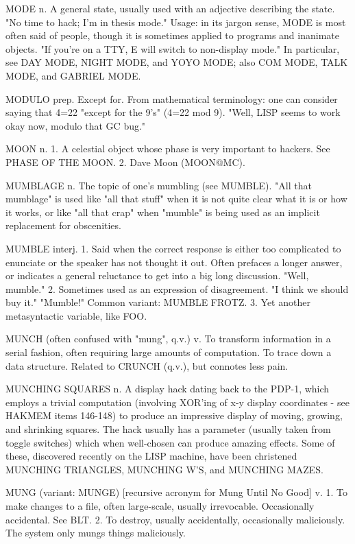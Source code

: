 MODE n. A general state, usually used with an adjective describing the
   state.  "No time to hack; I'm in thesis mode."  Usage: in its
   jargon sense, MODE is most often said of people, though it is
   sometimes applied to programs and inanimate objects.	 "If you're on
   a TTY, E will switch to non-display mode."  In particular, see DAY
   MODE, NIGHT MODE, and YOYO MODE; also COM MODE, TALK MODE, and
   GABRIEL MODE.

MODULO prep. Except for.  From mathematical terminology: one can
   consider saying that 4=22 "except for the 9's" (4=22 mod 9).
   "Well, LISP seems to work okay now, modulo that GC bug."

MOON n. 1. A celestial object whose phase is very important to
   hackers.  See PHASE OF THE MOON.  2. Dave Moon (MOON@MC).

MUMBLAGE n. The topic of one's mumbling (see MUMBLE).  "All that
   mumblage" is used like "all that stuff" when it is not quite clear
   what it is or how it works, or like "all that crap" when "mumble"
   is being used as an implicit replacement for obscenities.

MUMBLE interj. 1. Said when the correct response is either too
   complicated to enunciate or the speaker has not thought it out.
   Often prefaces a longer answer, or indicates a general reluctance
   to get into a big long discussion.  "Well, mumble."	2. Sometimes
   used as an expression of disagreement.  "I think we should buy it."
   "Mumble!"  Common variant: MUMBLE FROTZ.  3. Yet another
   metasyntactic variable, like FOO.

MUNCH (often confused with "mung", q.v.) v. To transform information
   in a serial fashion, often requiring large amounts of computation.
   To trace down a data structure.  Related to CRUNCH (q.v.), but
   connotes less pain.

MUNCHING SQUARES n. A display hack dating back to the PDP-1, which
   employs a trivial computation (involving XOR'ing of x-y display
   coordinates - see HAKMEM items 146-148) to produce an impressive
   display of moving, growing, and shrinking squares.  The hack
   usually has a parameter (usually taken from toggle switches) which
   when well-chosen can produce amazing effects.  Some of these,
   discovered recently on the LISP machine, have been christened
   MUNCHING TRIANGLES, MUNCHING W'S, and MUNCHING MAZES.

MUNG (variant: MUNGE) [recursive acronym for Mung Until No Good] v. 1.
   To make changes to a file, often large-scale, usually irrevocable.
   Occasionally accidental.  See BLT.  2. To destroy, usually
   accidentally, occasionally maliciously.  The system only mungs
   things maliciously.

